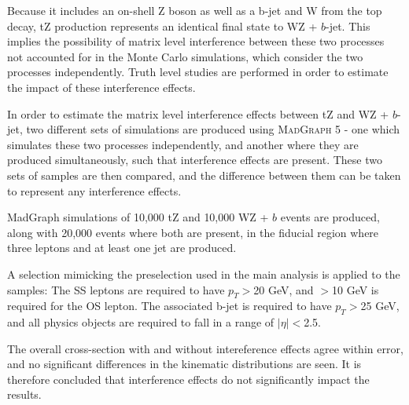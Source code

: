 
Because it includes an on-shell Z boson as well as a b-jet and W from the top decay, tZ production represents an identical final state  to WZ + $b$-jet. This implies the possibility of matrix level interference between these two processes not accounted for in the Monte Carlo simulations, which consider the two processes independently. Truth level studies are performed in order to estimate the impact of these interference effects.    

In order to estimate the matrix level interference effects between tZ and WZ + $b$-jet, two different sets of simulations are produced using \textsc{MadGraph} 5 \cite{Madgraph} - one which simulates these two processes independently, and another where they are  produced simultaneously, such that interference effects are present. These two sets of samples are then compared, and the difference between them can be taken to represent any interference effects.

MadGraph simulations of 10,000 tZ and 10,000 WZ + $b$ events are produced, along with 20,000 events where both are present, in the fiducial region where three leptons and at least one jet are produced.  

A selection mimicking the preselection used in the main analysis is applied to the samples: The SS leptons are required to have $p_T>$20 GeV, and $>$10 GeV is required for the OS lepton. The associated b-jet is required to have $p_T>$25 GeV, and all physics objects are required to fall in a range of $|\eta|<$2.5. 



The overall cross-section with and without intereference effects agree within error, and no significant differences in the kinematic distributions are seen. It is therefore concluded that interference effects do not significantly impact the results.
